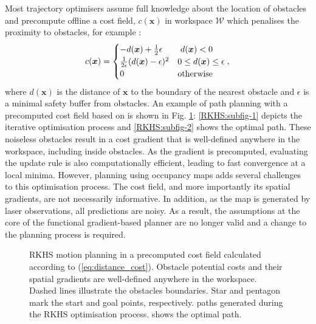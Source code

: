 \documentclass[letterpaper, 10 pt, conference]{ieeeconf}  %
\begin{document}
Most trajectory optimisers assume full knowledge about the location of obstacles and precompute offline a cost field, $c(\boldsymbol{x})$ in workspace $\mathcal{W}$ which penalises the proximity to obstacles, for example \cite{ratliff2009chomp}:
\begin{equation}\label{eq:distance_cost}
c({\boldsymbol{x}})=
\begin{cases}
	-d(\boldsymbol{x})+\frac{1}{2}\epsilon & \text{ $d(\boldsymbol{x}) < 0$}\\
	\frac{1}{2\epsilon}(d(\boldsymbol{x})-\epsilon)^2 & \text{$ 0 \leq d(\boldsymbol{x}) \leq \epsilon$}\\
	0 & \text{otherwise}\\
\end{cases},\\
\end{equation}      
where $d(\boldsymbol{x})$ is the distance of $\boldsymbol{x}$ to the boundary of the nearest obstacle and $\epsilon$ is a minimal safety buffer from obstacles. An example of path planning with a precomputed cost field based on \cite{Marinho2016} is shown in Fig. \ref{fig:RKHS}: \ref{RKHS:subfig-1} depicts the iterative optimisation process and \ref{RKHS:subfig-2} shows the optimal path. These noiseless obstacles result in a cost gradient that is well-defined anywhere in the workspace, including inside obstacles. As the gradient is precomputed, evaluating the update rule is also computationally efficient, leading to fast convergence at a local minima. However, planning using occupancy maps adds several challenges to this optimisation process. The cost field, and more importantly its spatial gradients, are not necessarily informative. In addition, as the map is generated by laser observations, all predictions are noisy. As a result, the assumptions at the core of the functional gradient-based planner are no longer valid and a change to the planning process is required.    

 \begin{figure}[!ht]
 \centering
 	\hspace{15pt}
 	\caption{RKHS motion planning \cite{Marinho2016} in a precomputed cost field calculated according to (\ref{eq:distance_cost}). Obstacle potential costs and their spatial gradients are well-defined anywhere in the workspace. Dashed lines illustrate the obstacles boundaries. Star and pentagon mark the start and goal points, respectively. \protect{}  paths generated during the RKHS optimisation process. \protect{} shows the optimal path.  }
 	\label{fig:RKHS}
 \end{figure}
\end{document}
